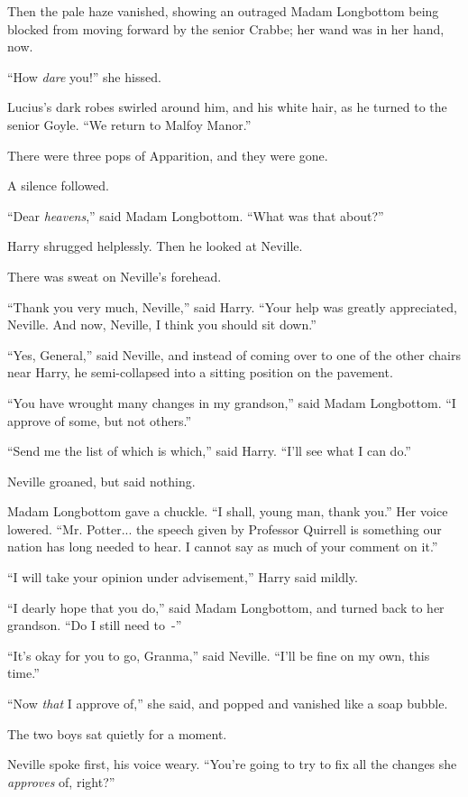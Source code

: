 Then the pale haze vanished, showing an outraged Madam Longbottom being blocked from moving forward by the senior Crabbe; her wand was in her hand, now.

``How \emph{dare} you!'' she hissed.

Lucius's dark robes swirled around him, and his white hair, as he turned to the senior Goyle. ``We return to Malfoy Manor.''

There were three pops of Apparition, and they were gone.

A silence followed.

``Dear \emph{heavens},'' said Madam Longbottom. ``What was that about?''

Harry shrugged helplessly. Then he looked at Neville.

There was sweat on Neville's forehead.

``Thank you very much, Neville,'' said Harry. ``Your help was greatly appreciated, Neville. And now, Neville, I think you should sit down.''

``Yes, General,'' said Neville, and instead of coming over to one of the other chairs near Harry, he semi-collapsed into a sitting position on the pavement.

``You have wrought many changes in my grandson,'' said Madam Longbottom. ``I approve of some, but not others.''

``Send me the list of which is which,'' said Harry. ``I'll see what I can do.''

Neville groaned, but said nothing.

Madam Longbottom gave a chuckle. ``I shall, young man, thank you.'' Her voice lowered. ``Mr. Potter... the speech given by Professor Quirrell is something our nation has long needed to hear. I cannot say as much of your comment on it.''

``I will take your opinion under advisement,'' Harry said mildly.

``I dearly hope that you do,'' said Madam Longbottom, and turned back to her grandson. ``Do I still need to~-''

``It's okay for you to go, Granma,'' said Neville. ``I'll be fine on my own, this time.''

``Now \emph{that} I approve of,'' she said, and popped and vanished like a soap bubble.

The two boys sat quietly for a moment.

Neville spoke first, his voice weary. ``You're going to try to fix all the changes she \emph{approves} of, right?''

